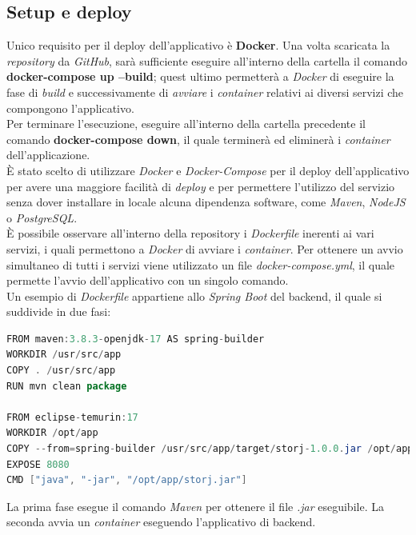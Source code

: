 \documentclass{article}
\begin{document}
\subsection{Setup e deploy}
Unico requisito per il deploy dell'applicativo è \textbf{Docker}. Una volta scaricata la \textit{repository} da \textit{GitHub}, sarà sufficiente eseguire all'interno della cartella il comando \textbf{docker-compose up --build}; quest ultimo permetterà a \textit{Docker} di eseguire la fase di \textit{build} e successivamente di \textit{avviare} i \textit{container} relativi ai diversi servizi che compongono l'applicativo.\vspace*{7pt}\\
Per terminare l'esecuzione, eseguire all'interno della cartella precedente il comando \textbf{docker-compose down}, il quale terminerà ed eliminerà i \textit{container} dell'applicazione.\vspace*{7pt}\\
È stato scelto di utilizzare \textit{Docker} e \textit{Docker-Compose} per il deploy dell'applicativo per avere una maggiore facilità di \textit{deploy} e per permettere l'utilizzo del servizio senza dover installare in locale alcuna dipendenza software, come \textit{Maven}, \textit{NodeJS} o \textit{PostgreSQL}.\vspace*{7pt}\\
È possibile osservare all'interno della repository i \textit{Dockerfile} inerenti ai vari servizi, i quali permettono a \textit{Docker} di avviare i \textit{container}. Per ottenere un avvio simultaneo di tutti i servizi viene utilizzato un file \textit{docker-compose.yml}, il quale permette l'avvio dell'applicativo con un singolo comando.\vspace*{7pt}\\
Un esempio di \textit{Dockerfile} appartiene allo \textit{Spring Boot} del backend, il quale si suddivide in due fasi:
\vspace*{7pt}
\begin{lstlisting}[language = JAVA]
FROM maven:3.8.3-openjdk-17 AS spring-builder
WORKDIR /usr/src/app
COPY . /usr/src/app
RUN mvn clean package

FROM eclipse-temurin:17
WORKDIR /opt/app
COPY --from=spring-builder /usr/src/app/target/storj-1.0.0.jar /opt/app/storj.jar
EXPOSE 8080
CMD ["java", "-jar", "/opt/app/storj.jar"]
\end{lstlisting}
La prima fase esegue il comando \textit{Maven} per ottenere il file \textit{.jar} eseguibile. La seconda avvia un \textit{container} eseguendo l'applicativo di backend.\vspace*{7pt}\\
\end{document}
